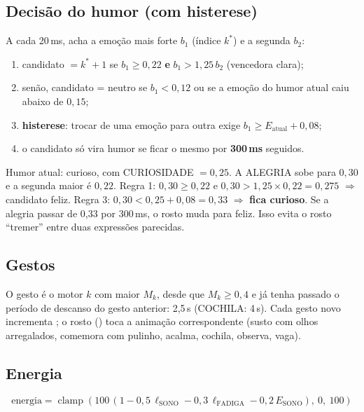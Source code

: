 \documentclass[11pt,a4paper]{article}
\DeclareRobustCommand{\cod}[1]{\texttt{\detokenize{#1}}}
\begin{document}
\subsection{Decisão do humor (com histerese)}

A cada 20\,ms, \cod{decidir()} acha a emoção mais forte $b_1$ (índice $k^\ast$) e a segunda $b_2$:
\begin{enumerate}
  \item candidato $= k^\ast + 1$ se $b_1 \ge 0{,}22$ \textbf{e} $b_1 > 1{,}25\,b_2$ (vencedora clara);
  \item senão, candidato = neutro se $b_1 < 0{,}12$ ou se a emoção do humor atual caiu abaixo de $0{,}15$;
  \item \textbf{histerese}: trocar de uma emoção para outra exige $b_1 \ge E_\text{atual} + 0{,}08$;
  \item o candidato só vira humor se ficar o mesmo por \textbf{300\,ms} seguidos.
\end{enumerate}

\begin{exemplo}[: histerese]
Humor atual: curioso, com CURIOSIDADE $= 0{,}25$. A ALEGRIA sobe para $0{,}30$ e a segunda maior é $0{,}22$.
Regra 1: $0{,}30 \ge 0{,}22$ e $0{,}30 > 1{,}25\times0{,}22 = 0{,}275$ $\Rightarrow$ candidato feliz. Regra 3: $0{,}30 < 0{,}25 + 0{,}08 = 0{,}33$
$\Rightarrow$ \textbf{fica curioso}. Se a alegria passar de 0,33 por 300\,ms, o rosto muda para feliz. Isso evita o rosto
“tremer” entre duas expressões parecidas.
\end{exemplo}

\subsection{Gestos}

O gesto é o motor $k$ com maior $M_k$, desde que $M_k \ge 0{,}4$ e já tenha passado o período de descanso do gesto anterior:
2,5\,s (COCHILA: 4\,s). Cada gesto novo incrementa \cod{gesto_n}; o rosto (\cod{face_snn}) toca a animação correspondente
(susto com olhos arregalados, comemora com pulinho, acalma, cochila, observa, vaga).

\subsection{Energia}
\begin{equation}
\text{energia} = \operatorname{clamp}\left(100\,\left(1 - 0{,}5\,\ell_\text{SONO} - 0{,}3\,\ell_\text{FADIGA} - 0{,}2\,E_\text{SONO}\right),\ 0,\ 100\right)
\end{equation}
\end{document}
